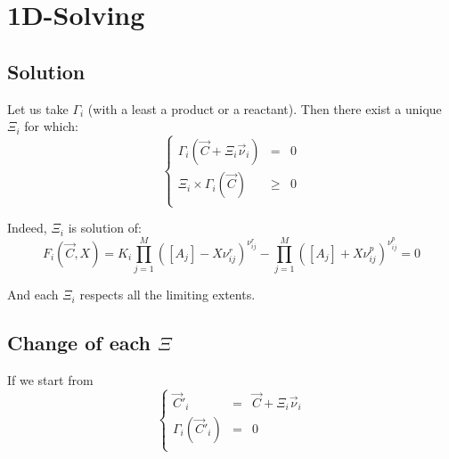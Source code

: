 \documentclass[aps,12pt]{revtex4}
\begin{document}
\section{1D-Solving}

\subsection{Solution}

Let us take $\Gamma_i$ (with a least a product or a reactant).
Then there exist a unique $\Xi_i$ for which:
\begin{equation}
\left\lbrace
\begin{array}{rcl}
	\Gamma_i(\vec{C} + \Xi_i \vec{\nu}_i ) & = & 0\\
	 \Xi_i \times \Gamma_i(\vec{C}) &\geq  &0\\
\end{array}
\right.
\end{equation}
 
Indeed, $\Xi_i$ is solution of:
\begin{equation}
	 F_i(\vec{C},X) =  K_i \prod_{j=1}^{M} \left([A_j] - X \nu^r_{ij}\right)^{\nu^r_{ij}} 
	- \prod_{j=1}^{M} \left([A_j] + X \nu^p_{ij} \right)^{\nu^p_{ij}} = 0
\end{equation} 

And each $\Xi_i$ respects all the limiting extents.



\subsection{Change of each $\Xi$}
If we start from
\begin{equation}
\left\lbrace
\begin{array}{rcl}
	\vec{C}'_i & = & \vec{C} + \Xi_i \vec{\nu}_i\\
	\Gamma_i(\vec{C}'_i) & = & 0\\
\end{array}
\right.
\end{equation}
\end{document}
